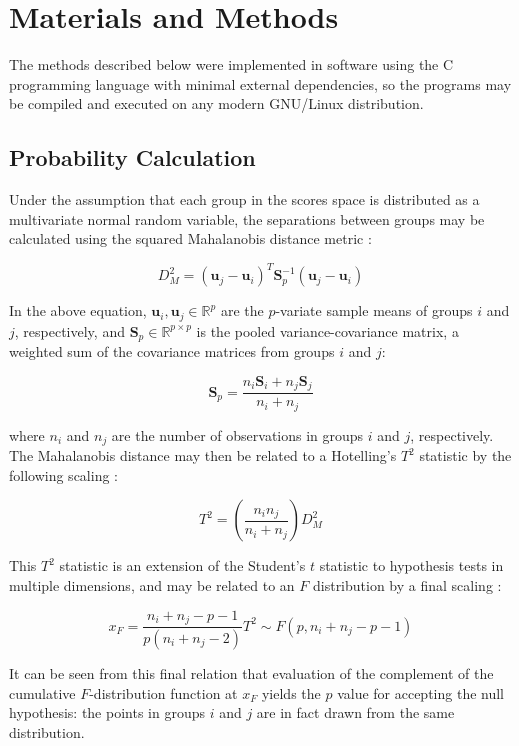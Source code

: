 \section{Materials and Methods}

\begin{doublespace}
The methods described below were implemented in software using the C
programming language with minimal external dependencies, so the programs
may be compiled and executed on any modern GNU/Linux distribution.
\end{doublespace}

\subsection{Probability Calculation}

\begin{doublespace}
Under the assumption that each group in the scores space is distributed as a
multivariate normal random variable, the separations between groups may be
calculated using the squared Mahalanobis distance metric
\cite{mahalanobis:pnisi1936}:

\begin{equation}
D_M^2 =
  (\mathbf{u}_j - \mathbf{u}_i)^T
  \mathbf{S}_p^{-1}
  (\mathbf{u}_j - \mathbf{u}_i)
\end{equation}

In the above equation, $\mathbf{u}_i, \mathbf{u}_j \in \mathbb{R}^p$ are the
$p$-variate sample means of groups $i$ and $j$, respectively, and
$\mathbf{S}_p \in \mathbb{R}^{p \times p}$ is the pooled variance-covariance
matrix, a weighted sum of the covariance matrices from groups $i$ and
$j$:

\begin{equation}
\mathbf{S}_p = \frac{n_i \mathbf{S}_i + n_j \mathbf{S}_j}{n_i + n_j}
\end{equation}

where $n_i$ and $n_j$ are the number of observations in groups $i$ and $j$,
respectively. The Mahalanobis distance may then be related to a Hotelling's
$T^2$ statistic by the following scaling \cite{mardia1979}:

\begin{equation}
T^2 = \left( \frac{n_i n_j}{n_i + n_j} \right) D_M^2
\end{equation}

This $T^2$ statistic is an extension of the Student's $t$ statistic to
hypothesis tests in multiple dimensions, and may be related to an $F$
distribution by a final scaling \cite{mardia1979}:

\begin{equation}
x_F =
  \frac{n_i + n_j - p - 1}{p (n_i + n_j - 2)} T^2 \sim
  F(p, n_i + n_j - p - 1)
\end{equation}

It can be seen from this final relation that evaluation of the complement of
the cumulative $F$-distribution function at $x_F$ yields the $p$ value for
accepting the null hypothesis: the points in groups $i$ and $j$ are in fact
drawn from the same distribution.
\end{doublespace}

